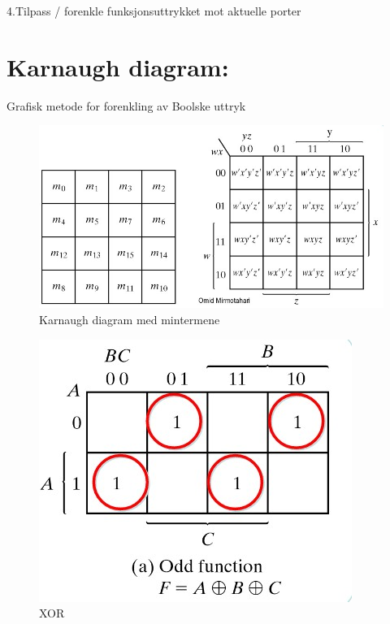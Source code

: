 \documentclass{article}
\begin{document}
	4.Tilpass / forenkle funksjonsuttrykket mot 
	aktuelle porter 
	
	\section*{Karnaugh diagram:}
	Grafisk metode for forenkling av Boolske uttryk
	\begin{figure}[H]
		\includegraphics[scale = 0.6]{KarnaD.jpg}
		\caption{Karnaugh diagram med mintermene}
	\end{figure}
	
	\begin{figure}[H]
		\includegraphics[scale = 0.6]{XOR.jpg}
		\caption{XOR}
	\end{figure}
	
\end{document}
